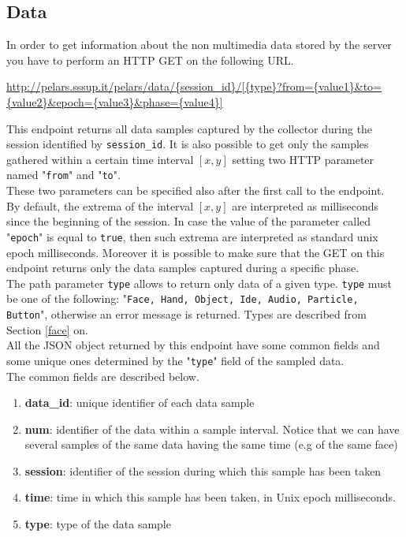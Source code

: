 \documentclass[a4paper,notitlepage,onecolumn]{hitec}  %
\begin{document}
\subsection{Data}\label{Data}
In order to get information about the non multimedia data stored by the server you have to perform an HTTP GET on the following URL.
\begin{center}
\url{http://pelars.sssup.it/pelars/data/{session_id}/[{type}?from={value1}&to={value2}&epoch={value3}&phase={value4}]}
\end{center}
This endpoint returns all data samples captured by the collector during the session identified by {\tt session\_id}. 
It is also possible to get only the samples gathered within a certain time interval $[x,y]$ setting two HTTP parameter named "{\tt from}" and "{\tt to}".\\
These two parameters can be specified also after the first call to the endpoint.\\
By default, the extrema of the interval $[x,y]$ are interpreted as milliseconds since the beginning of the session. In case the value of the parameter called "{\tt epoch}" is equal to {\tt true}, then such extrema are interpreted as standard unix epoch milliseconds. 
Moreover it is possible to make sure that the GET on this endpoint returns only the data samples captured during a specific phase.\\
The path parameter {\tt type} allows to return only data of a given type. {\tt type} must be one of the following: "{\tt Face, Hand, Object, Ide, Audio, Particle, Button}", otherwise an error message is returned. Types are described from Section \ref{face} on.\\
All the JSON object returned by this endpoint have some common fields and some unique ones determined by the "{\tt type}" field of the sampled data.\\
The common fields are described below.
\begin{enumerate}
\item\textbf{data\_id}: unique identifier of each data sample
\item\textbf{num}: identifier of the data within a sample interval. Notice that we can have several samples of the same data having the same time (e.g of the same face)
\item \textbf{session}: identifier of the session during which this sample has been taken
\item\textbf{time}: time in which this sample has been taken, in Unix epoch milliseconds.
\item\textbf{type}: type of the data sample
\end{enumerate}
\end{document}
